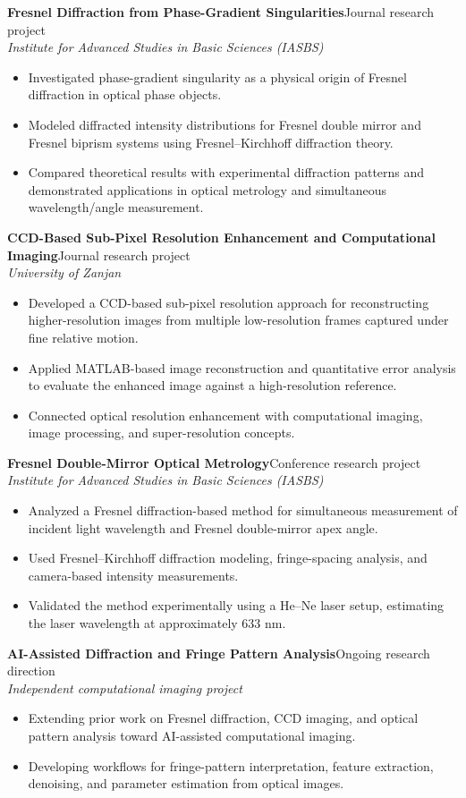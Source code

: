 \documentclass[11pt,a4paper]{article}
\newcommand{\entry}[4]{%
  \textbf{#1}\hfill {\color{light}#2}\\
  \textit{#3}\\[-1pt]
  #4\vspace{3pt}
}
\begin{document}
\entry{Fresnel Diffraction from Phase-Gradient Singularities}{Journal research project}
{Institute for Advanced Studies in Basic Sciences (IASBS)}
{
\begin{itemize}
  \item Investigated phase-gradient singularity as a physical origin of Fresnel diffraction in optical phase objects.
  \item Modeled diffracted intensity distributions for Fresnel double mirror and Fresnel biprism systems using Fresnel--Kirchhoff diffraction theory.
  \item Compared theoretical results with experimental diffraction patterns and demonstrated applications in optical metrology and simultaneous wavelength/angle measurement.
\end{itemize}
}

\entry{CCD-Based Sub-Pixel Resolution Enhancement and Computational Imaging}{Journal research project}
{University of Zanjan}
{
\begin{itemize}
  \item Developed a CCD-based sub-pixel resolution approach for reconstructing higher-resolution images from multiple low-resolution frames captured under fine relative motion.
  \item Applied MATLAB-based image reconstruction and quantitative error analysis to evaluate the enhanced image against a high-resolution reference.
  \item Connected optical resolution enhancement with computational imaging, image processing, and super-resolution concepts.
\end{itemize}
}

\entry{Fresnel Double-Mirror Optical Metrology}{Conference research project}
{Institute for Advanced Studies in Basic Sciences (IASBS)}
{
\begin{itemize}
  \item Analyzed a Fresnel diffraction-based method for simultaneous measurement of incident light wavelength and Fresnel double-mirror apex angle.
  \item Used Fresnel--Kirchhoff diffraction modeling, fringe-spacing analysis, and camera-based intensity measurements.
  \item Validated the method experimentally using a He--Ne laser setup, estimating the laser wavelength at approximately 633 nm.
\end{itemize}
}

\entry{AI-Assisted Diffraction and Fringe Pattern Analysis}{Ongoing research direction}
{Independent computational imaging project}
{
\begin{itemize}
  \item Extending prior work on Fresnel diffraction, CCD imaging, and optical pattern analysis toward AI-assisted computational imaging.
  \item Developing workflows for fringe-pattern interpretation, feature extraction, denoising, and parameter estimation from optical images.
\end{itemize}
}
\end{document}
